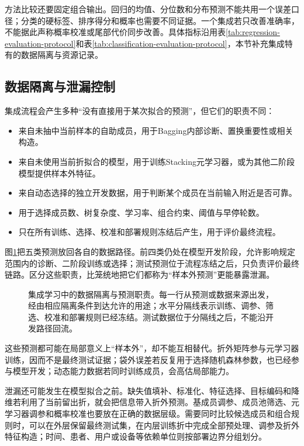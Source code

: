 方法比较还要固定组合输出。回归的均值、分位数和分布预测不能共用一个误差口径；分类的硬标签、排序得分和概率也需要不同证据。一个集成若只改善准确率，不能据此声称概率校准或尾部代价同步改善。具体指标沿用表\ref{tab:regression-evaluation-protocol}和表\ref{tab:classification-evaluation-protocol}，本节补充集成特有的数据隔离与资源记录。

\subsection{数据隔离与泄漏控制}
\label{sec:ensemble-data-isolation}

集成流程会产生多种“没有直接用于某次拟合的预测”，但它们的职责不同：
\begin{itemize}
  \item {}来自未抽中当前样本的自助成员，用于Bagging内部诊断、置换重要性或相关构造。
  \item {}来自未使用当前折拟合的模型，用于训练Stacking元学习器，或为其他二阶段模型提供样本外特征。
  \item {}来自动态选择的独立开发数据，用于判断某个成员在当前输入附近是否可靠。
  \item {}用于选择成员数、树复杂度、学习率、组合约束、阈值与早停轮数。
  \item {}只在所有训练、选择、校准和部署规则冻结后产生，用于评价最终流程。
\end{itemize}
图\ref{fig:ensemble-data-isolation}把五类预测放回各自的数据路径。前四类仍处在模型开发阶段，允许影响规定范围内的诊断、二阶段训练或选择；测试预测位于流程冻结之后，只负责评价最终链路。区分这些职责，比笼统地把它们都称为“样本外预测”更能暴露泄漏。

\begin{figure}[htbp]
  \centering
  
  \caption{集成学习中的数据隔离与预测职责。每一行从预测或数据来源出发，经由相应隔离条件到达允许的用途；水平分隔线表示训练、调参、筛选、校准和部署规则已经冻结。测试数据位于分隔线之后，不能沿开发路径回流。}
  \label{fig:ensemble-data-isolation}
\end{figure}

这些预测都可能在局部意义上“样本外”，却不能互相替代。折外矩阵参与元学习器训练，因而不是最终测试证据；袋外误差若反复用于选择随机森林参数，也已经参与模型开发；动态能力数据若同时训练成员，会高估局部能力。

泄漏还可能发生在模型拟合之前。缺失值填补、标准化、特征选择、目标编码和降维若利用了当前留出折，就会把信息带入折外预测。基成员调参、成员池筛选、元学习器调参和概率校准也要放在正确的数据层级。需要同时比较候选成员和组合规则时，可以在外层保留最终测试集，在内层训练折中完成全部预处理、调参及折外特征构造；时间、患者、用户或设备等依赖单位则按部署边界分组划分。

